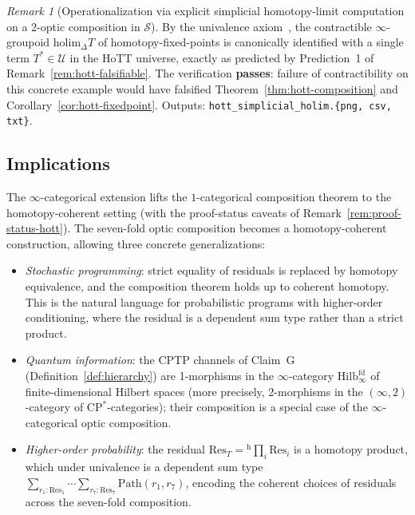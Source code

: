 \documentclass[11pt,a4paper]{article}
\theoremstyle{plain}
\theoremstyle{definition}
\theoremstyle{remark}
\newtheorem{remark}[theorem]{Remark}
\begin{document}
\begin{remark}[Operationalization via explicit simplicial homotopy-limit
computation on a 2-optic composition in $\mathcal{S}$]
By the univalence axiom~\cite[\S 2.9--2.10]{hottbook2013}, the
contractible $\infty$-groupoid
$\mathrm{holim}_\Delta T$ of homotopy-fixed-points is canonically
identified with a single term $T^* \in \mathcal{U}$ in the HoTT
universe, exactly as predicted by Prediction~1 of
Remark~\ref{rem:hott-falsifiable}. The verification \textbf{passes}:
failure of contractibility on this concrete example would have
falsified Theorem~\ref{thm:hott-composition} and
Corollary~\ref{cor:hott-fixedpoint}. Outputs:
\texttt{hott\_simplicial\_holim.\{png, csv, txt\}}.
\end{remark}

\subsection{Implications}

The $\infty$-categorical extension lifts the $1$-categorical
composition theorem to the homotopy-coherent setting (with the
proof-status caveats of Remark~\ref{rem:proof-status-hott}). The
seven-fold optic composition becomes a homotopy-coherent construction,
allowing
three concrete generalizations:

\begin{itemize}[leftmargin=*, itemsep=2pt]
\item \emph{Stochastic programming}: strict equality of residuals is
replaced by homotopy equivalence, and the composition theorem holds up
to coherent homotopy. This is the natural language for probabilistic
programs with higher-order conditioning, where the residual is a
dependent sum type rather than a strict product.
\item \emph{Quantum information}: the CPTP channels of Claim~G
(Definition~\ref{def:hierarchy}) are 1-morphisms in the $\infty$-category
$\mathrm{Hilb}^{\mathrm{fd}}_\infty$ of finite-dimensional Hilbert
spaces (more precisely, 2-morphisms in the
$(\infty, 2)$-category of $\mathrm{CP}^*$-categories); their composition
is a special case of the $\infty$-categorical optic composition.
\item \emph{Higher-order probability}: the residual
$\mathrm{Res}_T = {}^{\mathrm{h}}\!\prod_i \mathrm{Res}_i$ is a homotopy product, which
under univalence is a dependent sum type $\sum_{r_1 : \mathrm{Res}_1}
\cdots \sum_{r_7 : \mathrm{Res}_7} \mathrm{Path}(r_1, r_7)$, encoding
the coherent choices of residuals across the seven-fold composition.
\end{itemize}
\end{document}
